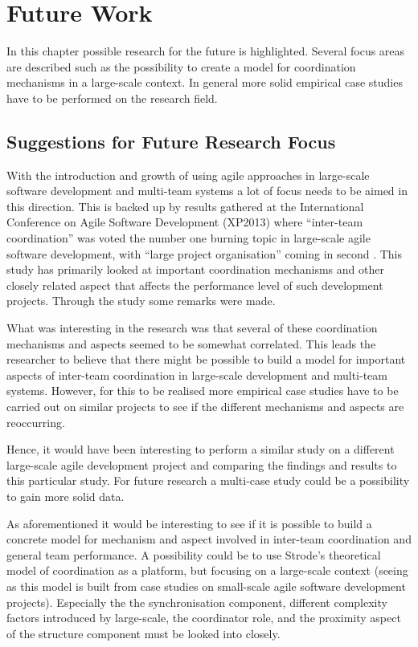 \chapter{Future Work}

\minitoc

In this chapter possible research for the future is highlighted. Several focus areas are described such as the possibility to create a model for coordination mechanisms in a large-scale context. In general more solid empirical case studies have to be performed on the research field.

\newpage

\section{Suggestions for Future Research Focus}

With the introduction and growth of using agile approaches in large-scale software development and multi-team systems a lot of focus needs to be aimed in this direction. This is backed up by results gathered at the International Conference on Agile Software Development (XP2013) where ``inter-team coordination'' was voted the number one burning topic in large-scale agile software development, with ``large project organisation'' coming in second \cite{Dingsoyr2013b}. This study has primarily looked at important coordination mechanisms and other closely related aspect that affects the performance level of such development projects. Through the study some remarks were made.

What was interesting in the research was that several of these coordination mechanisms and aspects seemed to be somewhat correlated. This leads the researcher to believe that there might be possible to build a model for important aspects of inter-team coordination in large-scale development and multi-team systems. However, for this to be realised more empirical case studies have to be carried out on similar projects to see if the different mechanisms and aspects are reoccurring.

Hence, it would have been interesting to perform a similar study on a different large-scale agile development project and comparing the findings and results to this particular study. For future research a multi-case study could be a possibility to gain more solid data.

As aforementioned it would be interesting to see if it is possible to build a concrete model for mechanism and aspect involved in inter-team coordination and general team performance. A possibility could be to use Strode's theoretical model of coordination as a platform, but focusing on a large-scale context (seeing as this model is built from case studies on small-scale agile software development projects). Especially the the synchronisation component, different complexity factors introduced by large-scale, the coordinator role, and the proximity aspect of the structure component must be looked into closely.

